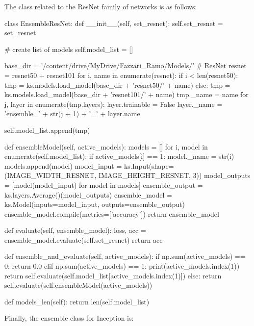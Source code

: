 The class related to the ResNet family of networks is as follows:

\begin{python}
class EnsembleResNet:
    def __init__(self, set_resnet):
        self.set_resnet = set_resnet

        # create list of models
        self.model_list = []

        base_dir = '/content/drive/MyDrive/Fazzari_Ramo/Models/'
        # ResNet
        resnet = resnet50 + resnet101
        for i, name in enumerate(resnet):
            if i < len(resnet50):
                tmp = ks.models.load_model(base_dir + 'resnet50/' + name)
            else:
                tmp = ks.models.load_model(base_dir + 'resnet101/' + name)
            tmp._name = name
            for j, layer in enumerate(tmp.layers):
                layer.trainable = False
                layer._name = 'ensemble_' + str(j + 1) + '_' + layer.name

            self.model_list.append(tmp)



    def ensembleModel(self, active_models):
        models = []
        for i, model in enumerate(self.model_list):
            if active_models[i] == 1:
                model._name = str(i)
                models.append(model)
        model_input = ks.Input(shape=(IMAGE_WIDTH_RESNET, IMAGE_HEIGHT_RESNET, 3))
        model_outputs = [model(model_input) for model in models]
        ensemble_output = ks.layers.Average()(model_outputs)
        ensemble_model = ks.Model(inputs=model_input, outputs=ensemble_output)
        ensemble_model.compile(metrics=['accuracy'])
        return ensemble_model

    def evaluate(self, ensemble_model):
        loss, acc = ensemble_model.evaluate(self.set_resnet)
        return acc

    def ensemble_and_evaluate(self, active_models):
        if np.sum(active_models) == 0:
            return 0.0
        elif np.sum(active_models) == 1:
            print(active_models.index(1))
            return self.evaluate(self.model_list[active_models.index(1)])
        else:
            return self.evaluate(self.ensembleModel(active_models))

    def models_len(self):
        return len(self.model_list)
\end{python}

Finally, the ensemble class for Inception is:

